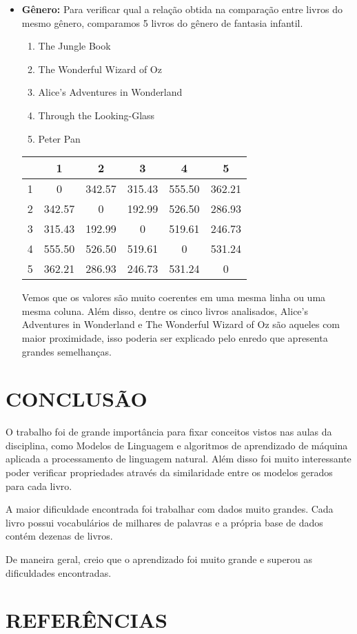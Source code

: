 \documentclass[12pt]{article}
\begin{document}
\begin{itemize}
	\item \textbf{Gênero:} Para verificar qual a relação obtida na
	comparação entre livros do mesmo gênero, comparamos 5 livros do
	gênero de fantasia infantil.

	\begin{enumerate}
		\item The Jungle Book
		\item The Wonderful Wizard of Oz
		\item Alice's Adventures in Wonderland
		\item Through the Looking-Glass
		\item Peter Pan
	\end{enumerate}

	\begin{center}
		\begin{tabular}{ |c|c|c|c|c|c| }
		\hline
		 & 1 & 2 & 3 & 4 & 5 \\ \hline
		1 & 0 & 342.57 & 315.43 & 555.50 & 362.21 \\
		2 & 342.57 & 0 & 192.99 & 526.50 & 286.93 \\
		3 & 315.43 & 192.99 & 0 & 519.61 & 246.73 \\
		4 & 555.50 & 526.50 & 519.61 & 0 & 531.24 \\
		5 & 362.21 & 286.93 & 246.73 & 531.24 & 0 \\
		\hline
		\end{tabular}
	\end{center}

	Vemos que os valores são muito coerentes em uma mesma linha ou
	uma mesma coluna. Além disso, dentre os cinco livros analisados,
	Alice's Adventures in Wonderland e The Wonderful Wizard of Oz são
	aqueles com maior proximidade, isso poderia ser explicado pelo
	enredo que apresenta grandes semelhanças. 

\end{itemize}

\section{CONCLUSÃO}

O trabalho foi de grande importância para fixar conceitos vistos nas aulas da disciplina, como
Modelos de Linguagem e algoritmos de aprendizado de máquina aplicada a processamento de linguagem
natural. Além disso foi muito interessante poder verificar propriedades através da similaridade entre
os modelos gerados para cada livro.

A maior dificuldade encontrada foi trabalhar com dados muito grandes. Cada livro possui vocabulários
de milhares de palavras e a própria base de dados contém dezenas de livros.

De maneira geral, creio que o aprendizado foi muito grande e superou as dificuldades encontradas.

\section{REFERÊNCIAS}



\end{document}
